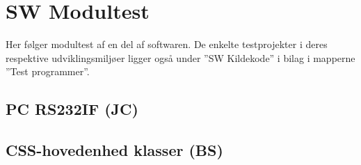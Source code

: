 \section{SW Modultest}
Her følger modultest af en del af softwaren. De enkelte testprojekter i deres respektive udviklingsmiljøer ligger også under ''SW Kildekode'' i bilag i mapperne ''Test programmer''.

\subsection{PC RS232IF (JC)}


\clearpage

\subsection{CSS-hovedenhed klasser (BS)}

